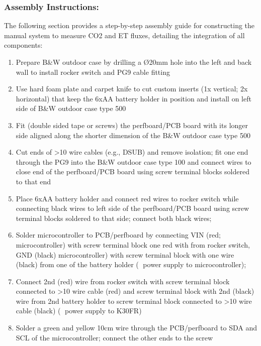 \documentclass[
  11pt,
  letterpaper,
]{book}
\begin{document}
\subsubsection{Assembly Instructions:}\label{sec-manual-flux-assembly}

The following section provides a step-by-step assembly guide for
constructing the manual system to measure CO2 and ET fluxes, detailing
the integration of all components:

\begin{enumerate}
\def\labelenumi{\arabic{enumi}.}
\item
  Prepare B\&W outdoor case by drilling a Ø20mm hole into the left and
  back wall to install rocker switch and PG9 cable fitting
\item
  Use hard foam plate and carpet knife to cut custom inserts (1x
  vertical; 2x horizontal) that keep the 6xAA battery holder in position
  and install on left side of B\&W outdoor case type 500
\item
  Fit (double sided tape or screws) the perfboard/PCB board with its
  longer side aligned along the shorter dimension of the B\&W outdoor
  case type 500
\item
  Cut ends of \textgreater10 wire cables (e.g., DSUB) and remove
  isolation; fit one end through the PG9 into the B\&W outdoor case type
  100 and connect wires to close end of the perfboard/PCB board using
  screw terminal blocks soldered to that end
\item
  Place 6xAA battery holder and connect red wires to rocker switch while
  connecting black wires to left side of the perfboard/PCB board using
  screw terminal blocks soldered to that side; connect both black wires;
\item
  Solder microcontroller to PCB/perfboard by connecting VIN (red;
  microcontroller) with screw terminal block one red with from rocker
  switch, GND (black) microcontroller) with screw terminal block with
  one wire (black) from one of the battery holder ( power supply to
  microcontroller);
\item
  Connect 2nd (red) wire from rocker switch with screw terminal block
  connected to \textgreater10 wire cable (red) and screw terminal block
  with 2nd (black) wire from 2nd battery holder to screw terminal block
  connected to \textgreater10 wire cable (black) ( power supply to
  K30FR)
\item
  Solder a green and yellow 10cm wire through the PCB/perfboard to SDA
  and SCL of the microcontroller; connect the other ends to the screw

\end{enumerate}
\end{document}
